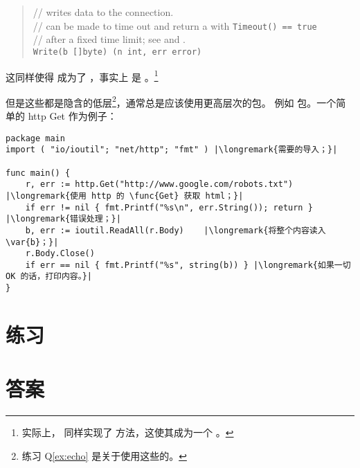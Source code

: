 \begin{quote}
//  writes data to the connection.\\
//  can be made to time out and return a  with \lstinline{Timeout() == true}\\
// after a fixed time limit; see  and .\\
\lstinline{Write(b []byte) (n int, err error)}
\end{quote}
这同样使得  成为了 ，事实上  是 。\footnote{实际上，
 同样实现了  方法，这使其成为一个 。}

但是这些都是隐含的低层\footnote{练习 Q\ref{ex:echo} 是关于使用这些的。}，通常总是应该使用更高层次的包。
例如  包。一个简单的 http Get 作为例子：
\begin{lstlisting}
package main
import ( "io/ioutil"; "net/http"; "fmt" ) |\longremark{需要的导入；}|

func main() {
    r, err := http.Get("http://www.google.com/robots.txt") |\longremark{使用 http 的 \func{Get} 获取 html；}|
    if err != nil { fmt.Printf("%s\n", err.String()); return } |\longremark{错误处理；}|
    b, err := ioutil.ReadAll(r.Body)    |\longremark{将整个内容读入 \var{b}；}|
    r.Body.Close()  
    if err == nil { fmt.Printf("%s", string(b)) } |\longremark{如果一切 OK 的话，打印内容。}|
}
\end{lstlisting}
\showremarks

\section{练习}














\cleardoublepage
\section{答案}
\shipoutAnswer
